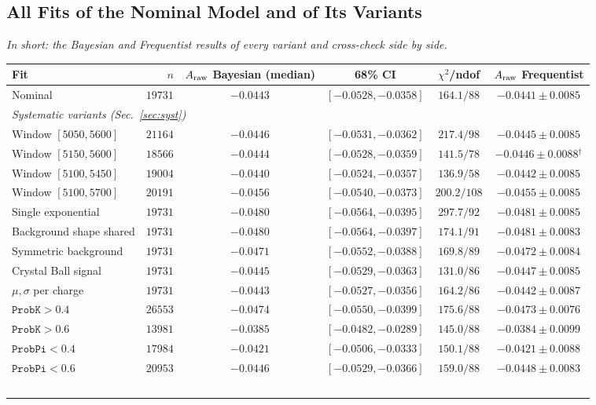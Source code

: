 \subsection{All Fits of the Nominal Model and of Its Variants}
\label{sec:syst_tables}
\emph{In short: the Bayesian and Frequentist results of every variant and cross-check side by side.}
\begin{table}[t]
\centering
\begin{tabular}{lrccc|c}
\toprule
Fit & $n$ & $\Araw$ Bayesian (median) & 68\% CI & $\chi^2$/ndof & $\Araw$ Frequentist \\
\midrule
Nominal & $19731$ & $-0.0443$ & $[-0.0528,-0.0358]$ & $164.1/88$ & $-0.0441\pm0.0085$ \\
\multicolumn{6}{l}{\emph{Systematic variants (Sec.~\ref{sec:syst})}} \\
Window $[5050,5600]$ & $21164$ & $-0.0446$ & $[-0.0531,-0.0362]$ & $217.4/98$ & $-0.0445\pm0.0085$ \\
Window $[5150,5600]$ & $18566$ & $-0.0444$ & $[-0.0528,-0.0359]$ & $141.5/78$ & $-0.0446\pm0.0088$$^\dagger$ \\
Window $[5100,5450]$ & $19004$ & $-0.0440$ & $[-0.0524,-0.0357]$ & $136.9/58$ & $-0.0442\pm0.0085$ \\
Window $[5100,5700]$ & $20191$ & $-0.0456$ & $[-0.0540,-0.0373]$ & $200.2/108$ & $-0.0455\pm0.0085$ \\
Single exponential & $19731$ & $-0.0480$ & $[-0.0564,-0.0395]$ & $297.7/92$ & $-0.0481\pm0.0085$ \\
Background shape shared & $19731$ & $-0.0480$ & $[-0.0564,-0.0397]$ & $174.1/91$ & $-0.0481\pm0.0083$ \\
Symmetric background & $19731$ & $-0.0471$ & $[-0.0552,-0.0388]$ & $169.8/89$ & $-0.0472\pm0.0084$ \\
Crystal Ball signal & $19731$ & $-0.0445$ & $[-0.0529,-0.0363]$ & $131.0/86$ & $-0.0447\pm0.0085$ \\
$\mu,\sigma$ per charge & $19731$ & $-0.0443$ & $[-0.0527,-0.0356]$ & $164.2/86$ & $-0.0442\pm0.0087$ \\
$\texttt{ProbK}>0.4$ & $26553$ & $-0.0474$ & $[-0.0550,-0.0399]$ & $175.6/88$ & $-0.0473\pm0.0076$ \\
$\texttt{ProbK}>0.6$ & $13981$ & $-0.0385$ & $[-0.0482,-0.0289]$ & $145.0/88$ & $-0.0384\pm0.0099$ \\
$\texttt{ProbPi}<0.4$ & $17984$ & $-0.0421$ & $[-0.0506,-0.0333]$ & $150.1/88$ & $-0.0421\pm0.0088$ \\
$\texttt{ProbPi}<0.6$ & $20953$ & $-0.0446$ & $[-0.0529,-0.0366]$ & $159.0/88$ & $-0.0448\pm0.0083$ \\
$$
\end{tabular}
\end{table}
